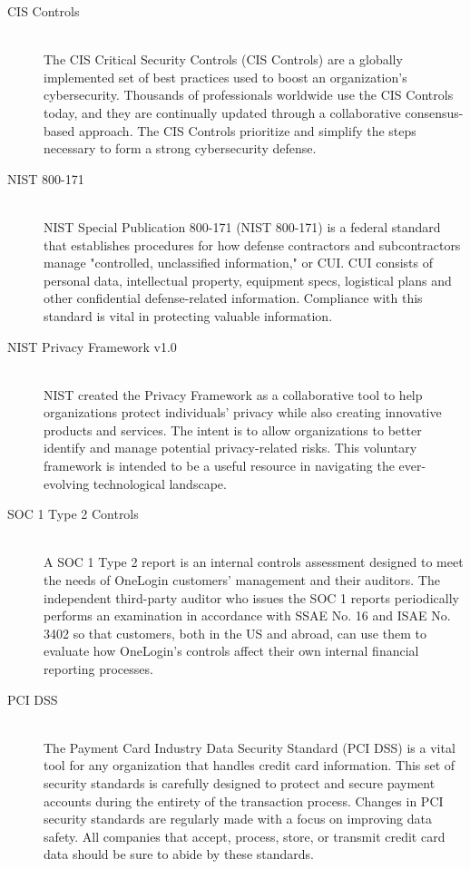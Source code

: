 \begin{description}
     \item[CIS Controls] \hfill \\
          The CIS Critical Security Controls (CIS Controls) are a globally implemented set of best practices used to boost an organization's cybersecurity. Thousands of professionals worldwide use the CIS Controls today, and they are continually updated through a collaborative consensus-based approach. The CIS Controls prioritize and simplify the steps necessary to form a strong cybersecurity defense.
     \item[NIST 800-171] \hfill \\
          NIST Special Publication 800-171 (NIST 800-171) is a federal standard that establishes procedures for how defense contractors and subcontractors manage "controlled, unclassified information," or CUI. CUI consists of personal data, intellectual property, equipment specs, logistical plans and other confidential defense-related information. Compliance with this standard is vital in protecting valuable information.
     \item[NIST Privacy Framework v1.0] \hfill \\
          NIST created the Privacy Framework as a collaborative tool to help organizations protect individuals' privacy while also creating innovative products and services. The intent is to allow organizations to better identify and manage potential privacy-related risks. This voluntary framework is intended to be a useful resource in navigating the ever-evolving technological landscape.
     \item[SOC 1 Type 2 Controls] \hfill \\
          A SOC 1 Type 2 report is an internal controls assessment designed to meet the needs of OneLogin customers' management and their auditors. The independent third-party auditor who issues the SOC 1 reports periodically performs an examination in accordance with SSAE No. 16 and ISAE No. 3402 so that customers, both in the US and abroad, can use them to evaluate how OneLogin's controls affect their own internal financial reporting processes.
     \item[PCI DSS] \hfill \\
          The Payment Card Industry Data Security Standard (PCI DSS) is a vital tool for any organization that handles credit card information. This set of security standards is carefully designed to protect and secure payment accounts during the entirety of the transaction process. Changes in PCI security standards are regularly made with a focus on improving data safety. All companies that accept, process, store, or transmit credit card data should be sure to abide by these standards.

\end{description}
